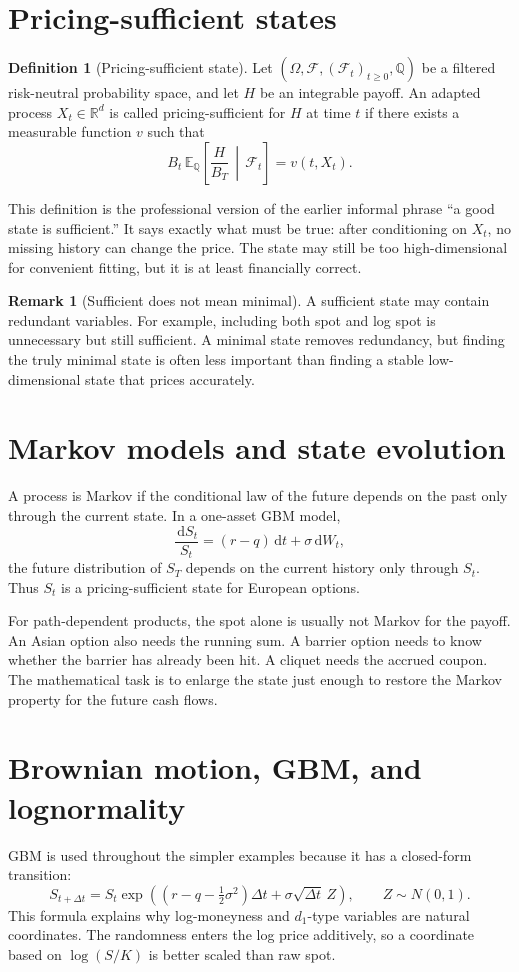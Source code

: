 \documentclass[11pt,oneside]{book}
\theoremstyle{definition}
\newtheorem{definition}{Definition}[chapter]
\newtheorem{remark}{Remark}[chapter]
\newcommand{\E}{\mathbb{E}}
\newcommand{\Q}{\mathbb{Q}}
\newcommand{\R}{\mathbb{R}}
\newcommand{\dd}{\,\mathrm{d}}
\begin{document}
\section{Pricing-sufficient states}
\begin{definition}[Pricing-sufficient state]
Let \((\Omega,\mathcal F,(\mathcal F_t)_{t\ge0},\Q)\) be a filtered risk-neutral probability space, and let \(H\) be an integrable payoff. An adapted process \(X_t\in\R^d\) is called pricing-sufficient for \(H\) at time \(t\) if there exists a measurable function \(v\) such that
\[
  B_t\,\E_\Q\!\left[\frac{H}{B_T}\,\middle|\,\mathcal F_t\right]
  =
  v(t,X_t).
\]
\end{definition}

This definition is the professional version of the earlier informal phrase ``a good state is sufficient.'' It says exactly what must be true: after conditioning on \(X_t\), no missing history can change the price. The state may still be too high-dimensional for convenient fitting, but it is at least financially correct.

\begin{remark}[Sufficient does not mean minimal]
A sufficient state may contain redundant variables. For example, including both spot and log spot is unnecessary but still sufficient. A minimal state removes redundancy, but finding the truly minimal state is often less important than finding a stable low-dimensional state that prices accurately.
\end{remark}

\section{Markov models and state evolution}
A process is Markov if the conditional law of the future depends on the past only through the current state. In a one-asset GBM model,
\[
  \frac{\dd S_t}{S_t}=(r-q)\dd t+\sigma\dd W_t,
\]
the future distribution of \(S_T\) depends on the current history only through \(S_t\). Thus \(S_t\) is a pricing-sufficient state for European options.

For path-dependent products, the spot alone is usually not Markov for the payoff. An Asian option also needs the running sum. A barrier option needs to know whether the barrier has already been hit. A cliquet needs the accrued coupon. The mathematical task is to enlarge the state just enough to restore the Markov property for the future cash flows.

\section{Brownian motion, GBM, and lognormality}
GBM is used throughout the simpler examples because it has a closed-form transition:
\[
  S_{t+\Delta t}
  =
  S_t
  \exp\!\left((r-q-\tfrac12\sigma^2)\Delta t+\sigma\sqrt{\Delta t}\,Z\right),
  \qquad Z\sim N(0,1).
\]
This formula explains why log-moneyness and \(d_1\)-type variables are natural coordinates. The randomness enters the log price additively, so a coordinate based on \(\log(S/K)\) is better scaled than raw spot.
\end{document}
